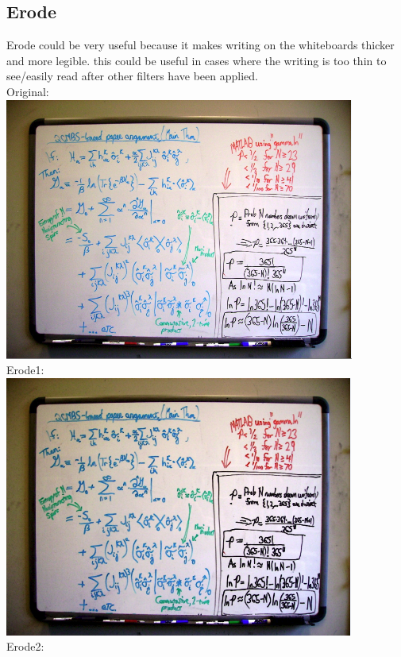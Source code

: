 \documentclass[]{article}
\begin{document}
		\subsection{Erode}

			Erode could be very useful because it makes writing on the whiteboards thicker and more legible. this could be useful in cases where the writing is too thin to see/easily read after other filters have been applied.\\

			Original:\\
			\includegraphics{images/originalSmall.png} \\
			Erode1:\\
			\includegraphics{images/erodeSmall1.png} \\
			Erode2:\\
\end{document}

